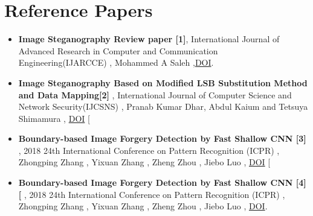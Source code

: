 \documentclass{beamer} %
\theoremstyle{definition} %
\begin{document}
\section{Reference Papers}

\begin{itemize}
	\item{\textbf{Image Steganography Review paper [1]}, International Journal of Advanced Research in Computer and Communication Engineering(IJARCCE) , Mohammed A  Saleh ,\href{https://ijarcce.com/wp-content/uploads/2018/10/IJARCCE20187910.pdf} {DOI}. }
\end{itemize}

\begin{itemize}
	\item{\textbf{Image Steganography Based on Modified LSB Substitution Method and Data Mapping[2]} ,   International Journal of Computer Science and Network Security(IJCSNS) , Pranab Kumar Dhar, Abdul Kaium and Tetsuya Shimamura , \href{http://paper [ ijcsns [ org/07_book/201803/20180321 [ pdf}{DOI} [ }
	\end{itemize}
\begin{itemize}
	\item{\textbf{Boundary-based Image Forgery Detection by Fast Shallow CNN
	[3]} , 2018 24th International Conference on Pattern Recognition (ICPR) , Zhongping Zhang , Yixuan Zhang , Zheng Zhou , Jiebo Luo , \href{http://doi [ org/10 [ 1109/ICPR [ 2018 [ 8545074} {DOI} [  }

\end{itemize}

\begin{itemize}
	\item {\textbf{Boundary-based Image Forgery Detection by Fast Shallow CNN [4]  [ } , 2018 24th International Conference on Pattern Recognition (ICPR) , Zhongping Zhang , Yixuan Zhang , Zheng Zhou , Jiebo Luo , \href{https://doi. org/10. 1109/ICPR. 2018. 8545074}{DOI}. }
\end{itemize}
\end{document}
